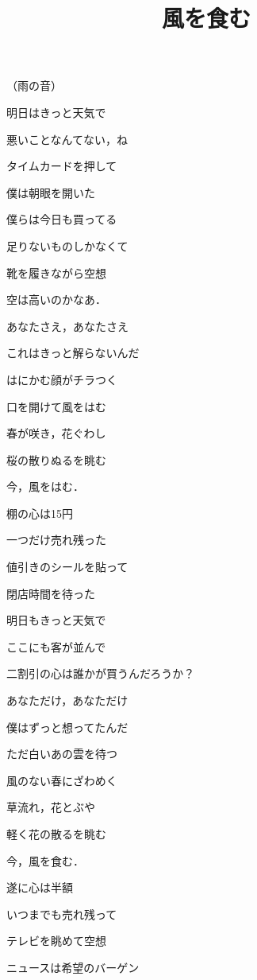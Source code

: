 \documentclass[uplatex, dvipdfmx, twocolumn]{jsarticle}
\title{風を食む}
\author{}
\date{}
\begin{document}
\maketitle

（雨の音）

明日はきっと天気で

悪いことなんてない，ね

タイムカードを押して

僕は朝眼を開いた

僕らは今日も買ってる

足りないものしかなくて

靴を履きながら空想

空は高いのかなあ．

\vspace{2mm}

あなたさえ，あなたさえ

これはきっと解らないんだ

はにかむ顔がチラつく

口を開けて風をはむ

春が咲き，花ぐわし

桜の散りぬるを眺む

今，風をはむ．

\vspace{2mm}

棚の心は15円

一つだけ売れ残った

値引きのシールを貼って

閉店時間を待った

明日もきっと天気で

ここにも客が並んで

二割引の心は誰かが買うんだろうか？

\vspace{2mm}

あなただけ，あなただけ

僕はずっと想ってたんだ

ただ白いあの雲を待つ

風のない春にざわめく

草流れ，花とぶや

軽く花の散るを眺む

今，風を食む．

\newpage

遂に心は半額

いつまでも売れ残って

テレビを眺めて空想

ニュースは希望のバーゲン
\end{document}

